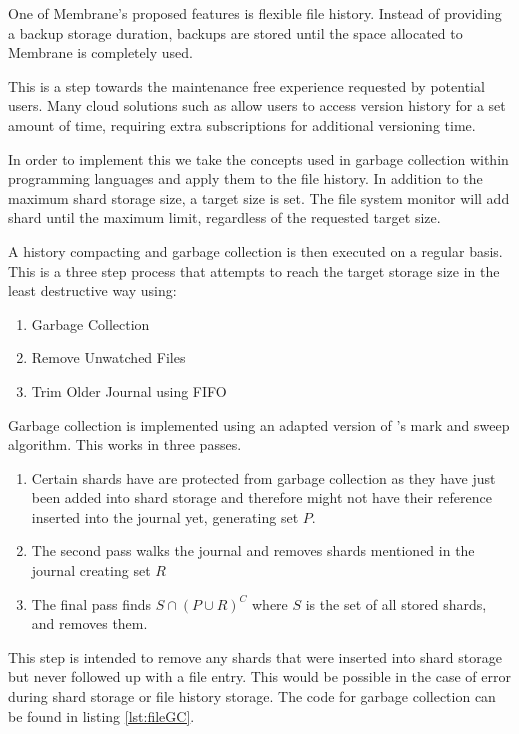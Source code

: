 \documentclass[11pt, a4paper, twocolumn, twoside]{report}
\begin{document}
One of Membrane's proposed features is flexible file history. Instead of providing a backup storage duration, backups are stored until the space allocated to Membrane is completely used.

This is a step towards the maintenance free experience requested by potential users. Many cloud solutions such as \cite{dropbox2017versions} allow users to access version history for a set amount of time, requiring extra subscriptions for additional versioning time.

In order to implement this we take the concepts used in garbage collection within programming languages and apply them to the file history. In addition to the maximum shard storage size, a target size is set. The file system monitor will add shard until the maximum limit, regardless of the requested target size.

A history compacting and garbage collection is then executed on a regular basis. This is a three step process that attempts to reach the target storage size in the least destructive way using:

\begin{enumerate}
 \item Garbage Collection
 \item Remove Unwatched Files
 \item Trim Older Journal using FIFO
\end{enumerate}

Garbage collection is implemented using an adapted version of \cite{dijkstra1978fly}'s mark and sweep algorithm. This works in three passes. 

\begin{enumerate}
 \item Certain shards have are protected from garbage collection as they have just been added into shard storage and therefore might not have their reference inserted into the journal yet, generating set $P$.
 \item The second pass walks the journal and removes shards mentioned in the journal creating set $R$
 \item The final pass finds $S \cap (P \cup R)^C$ where $S$ is the set of all stored shards, and removes them.
\end{enumerate}

This step is intended to remove any shards that were inserted into shard storage but never followed up with a file entry. This would be possible in the case of error during shard storage or file history storage. The code for garbage collection can be found in listing \ref{lst:fileGC}.
\end{document}
